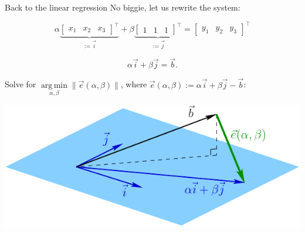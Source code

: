 \documentclass[UKenglish,aspectratio=169]{beamer}
\DeclareMathOperator*{\argmin}{arg\,min}
\begin{document}
\begin{frame}{Back to the linear regression}
No biggie, let us rewrite the system:\\
\begin{minipage}{.55\linewidth}
$$
\alpha \underbrace{\begin{bmatrix}x_1  & x_2 &x_3  \end{bmatrix}^\top }_{:=\vec{i}}
+\beta \underbrace{\begin{bmatrix}1 & 1 &1 \end{bmatrix}^\top }_{:=\vec{j}} =
\begin{bmatrix}y_1 & y_2 & y_3\end{bmatrix}^\top
$$
\end{minipage}\pause
\begin{minipage}{.35\linewidth}
$$
\alpha \vec{i} + \beta\vec{j} = \vec{b}.
$$
\end{minipage}

\pause
Solve for $\argmin\limits_{\alpha, \beta} \|\vec{e}(\alpha, \beta)\|$, where $\vec{e}(\alpha, \beta) :=  \alpha \vec{i} + \beta\vec{j} - \vec b$:
\begin{center}
\includegraphics[width=.6\linewidth]{../manuscript/img/error.pdf}
\end{center}
\end{frame}
\end{document}
